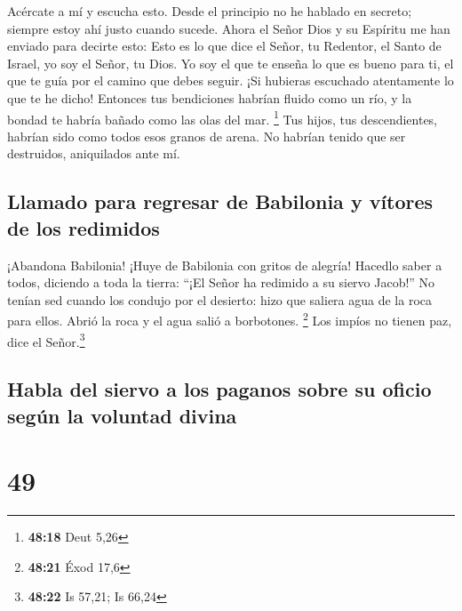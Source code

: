  Acércate a mí y escucha esto. Desde el principio no he
hablado en secreto; siempre estoy ahí justo cuando sucede. Ahora el
Señor Dios y su Espíritu me han enviado para decirte esto:
 Esto es lo que dice el Señor, tu Redentor, el Santo de
Israel, yo soy el Señor, tu Dios. Yo soy el que te enseña lo que es
bueno para ti, el que te guía por el camino que debes seguir.
 ¡Si hubieras escuchado atentamente lo que te he dicho!
Entonces tus bendiciones habrían fluido como un río, y la bondad te
habría bañado como las olas del mar. \footnote{\textbf{48:18} Deut 5,26}
 Tus hijos, tus descendientes, habrían sido como todos
esos granos de arena. No habrían tenido que ser destruidos, aniquilados
ante mí.

\hypertarget{llamado-para-regresar-de-babilonia-y-vuxedtores-de-los-redimidos}{%
\subsection{Llamado para regresar de Babilonia y vítores de los
redimidos}\label{llamado-para-regresar-de-babilonia-y-vuxedtores-de-los-redimidos}}

 ¡Abandona Babilonia! ¡Huye de Babilonia con gritos de
alegría! Hacedlo saber a todos, diciendo a toda la tierra: ``¡El Señor
ha redimido a su siervo Jacob!''  No tenían sed cuando
los condujo por el desierto: hizo que saliera agua de la roca para
ellos. Abrió la roca y el agua salió a borbotones. \footnote{\textbf{48:21}
  Éxod 17,6}  Los impíos no tienen paz, dice el
Señor.\footnote{\textbf{48:22} Is 57,21; Is 66,24}

\hypertarget{habla-del-siervo-a-los-paganos-sobre-su-oficio-seguxfan-la-voluntad-divina}{%
\subsection{Habla del siervo a los paganos sobre su oficio según la
voluntad
divina}\label{habla-del-siervo-a-los-paganos-sobre-su-oficio-seguxfan-la-voluntad-divina}}

\hypertarget{section-48}{%
\section{49}\label{section-48}}


